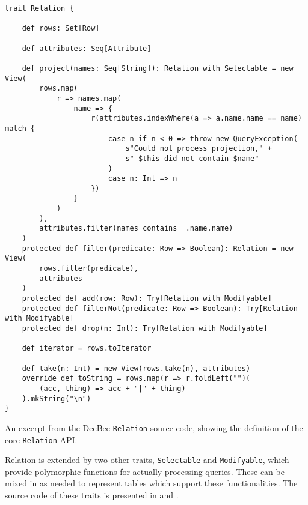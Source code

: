 \begin{listing}[H]
    \begin{verbatim}
trait Relation {

    def rows: Set[Row]

    def attributes: Seq[Attribute]

    def project(names: Seq[String]): Relation with Selectable = new View(
        rows.map(
            r => names.map(
                name => {
                    r(attributes.indexWhere(a => a.name.name == name) match {
                        case n if n < 0 => throw new QueryException(
                            s"Could not process projection," +
                            s" $this did not contain $name"
                        )
                        case n: Int => n
                    })
                }
            )
        ),
        attributes.filter(names contains _.name.name)
    )
    protected def filter(predicate: Row => Boolean): Relation = new View(
        rows.filter(predicate),
        attributes
    )
    protected def add(row: Row): Try[Relation with Modifyable]
    protected def filterNot(predicate: Row => Boolean): Try[Relation with Modifyable]
    protected def drop(n: Int): Try[Relation with Modifyable]

    def iterator = rows.toIterator

    def take(n: Int) = new View(rows.take(n), attributes)
    override def toString = rows.map(r => r.foldLeft("")(
        (acc, thing) => acc + "|" + thing)
    ).mkString("\n")
}

    \end{verbatim}
    \caption{An excerpt from the DeeBee \texttt{Relation} source code, showing the definition of the core \texttt{Relation} API.}
    \label{lst:relation}
\end{listing}

Relation is extended by two other traits, \texttt{Selectable} and \texttt{Modifyable}, which provide polymorphic functions for actually processing queries. These can be mixed in as needed to represent tables which support these functionalities. The source code of these traits is presented in  and .

